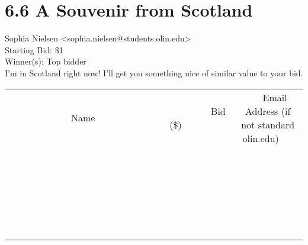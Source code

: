 \documentclass[11pt]{article}
\begin{document}
					\section*{6.6 A Souvenir from Scotland}
					Sophia Nielsen <sophia.nielsen@students.olin.edu> \\
					Starting Bid: \$1 \\
					Winner(s): Top bidder \\
					I’m in Scotland right now! I’ll get you something nice of similar value to your bid. \\
					[6ex]
					\begin{tabular}{c c c}
						~~~~~~~~~~~~~Name~~~~~~~~~~~~~ & ~~~~~~~~~Bid (\$)~~~~~~~~~ & ~~~Email Address (if not standard olin.edu)~~~ \\
				
 & & \\
\hline
 & & \\
\hline
 & & \\
\hline
 & & \\
\hline
 & & \\
\hline
 & & \\
\hline
 & & \\
\hline
 & & \\
\hline
 & & \\
\hline
 & & \\
\hline
 & & \\
\hline
 & & \\
\hline
 & & \\
\hline
 & & \\
\hline
 & & \\
\hline
 & & \\
\hline
 & & \\
\hline
 & & \\
\hline
 & & \\
\hline
 & & \\
\hline
 & & \\
\hline
 & & \\
\hline
 & & \\
\hline
 & & \\
\hline
 & & \\
\hline
 & & \\
\hline
					\end{tabular}
					\clearpage
				
\end{document}
